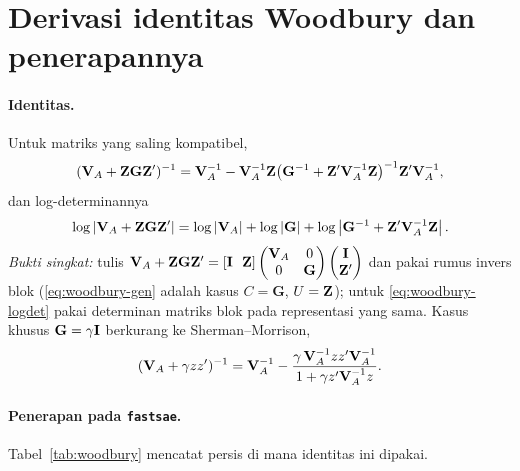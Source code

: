 \appendix

\section{Derivasi identitas Woodbury dan penerapannya}\label{app:woodbury}

\paragraph{Identitas.} Untuk matriks yang saling kompatibel,
\begin{equation}
  (\mathbf{V}_A+\mathbf{Z}\mathbf G\mathbf{Z}')^{-1}
  =\mathbf{V}_A^{-1}-\mathbf{V}_A^{-1}\mathbf{Z}
   \bigl(\mathbf G^{-1}+\mathbf{Z}'\mathbf{V}_A^{-1}\mathbf{Z}\bigr)^{-1}
   \mathbf{Z}'\mathbf{V}_A^{-1},
  \label{eq:woodbury-gen}
\end{equation}
dan log-determinannya
\begin{equation}
  \log\left|\mathbf{V}_A+\mathbf{Z}\mathbf G\mathbf{Z}'\right|
  =\log\left|\mathbf{V}_A\right|+\log\left|\mathbf G\right|
   +\log\left|\mathbf G^{-1}+\mathbf{Z}'\mathbf{V}_A^{-1}\mathbf{Z}\right|.
  \label{eq:woodbury-logdet}
\end{equation}
\emph{Bukti singkat:} tulis $\mathbf{V}_A+\mathbf{Z}\mathbf G\mathbf{Z}'=
[\mathbf{I}\ \ \mathbf{Z}]\begin{pmatrix}\mathbf{V}_A&0\\0&\mathbf G\end{pmatrix}
\begin{pmatrix}\mathbf{I}\\ \mathbf{Z}'\end{pmatrix}$ dan pakai rumus invers blok
(\eqref{eq:woodbury-gen} adalah kasus $C=\mathbf G$, $U=\mathbf{Z}$); untuk
\eqref{eq:woodbury-logdet} pakai determinan matriks blok pada representasi
yang sama. Kasus khusus $\mathbf G=\gamma\mathbf{I}$ berkurang ke
Sherman--Morrison,
\begin{equation}
  (\mathbf{V}_A+\gamma z z')^{-1}=\mathbf{V}_A^{-1}
  -\frac{\gamma\,\mathbf{V}_A^{-1}zz'\mathbf{V}_A^{-1}}{1+\gamma z'\mathbf{V}_A^{-1}z}.
  \label{eq:sm}
\end{equation}

\paragraph{Penerapan pada \texttt{fastsae}.} Tabel~\ref{tab:woodbury} mencatat
persis di mana identitas ini dipakai.

